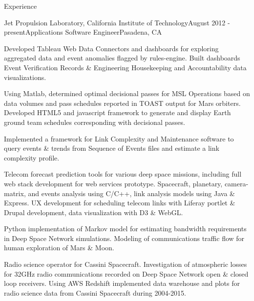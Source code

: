 \documentclass{resume} %
\begin{document}





\begin{rSection}{Experience}
\begin{rSubsection}{Jet Propulsion Laboratory, California Institute of Technology}{August 2012 - present}{Applications Software Engineer}{Pasadena, CA}
\item Developed Tableau Web Data Connectors and dashboards for exploring aggregated data and event anomalies flagged by rules-engine. Built dashboards Event Verification Records \& Engineering Housekeeping and Accountability data visualizations.
\item Using Matlab, determined optimal decisional passes for MSL Operations based on data volumes and pass schedules reported in TOAST output for Mars orbiters. Developed HTML5 and javascript framework to generate and display Earth ground team schedules corresponding with decisional passes.
\item Implemented a framework for Link Complexity and Maintenance software to query events \& trends from Sequence of Events files and estimate a link complexity profile.
\item Telecom forecast prediction tools for various deep space missions, including full web stack development for web services prototype. Spacecraft, planetary, camera-matrix, and events analysis using C/C++, link analysis models using Java \& Express. UX development for scheduling telecom links with Liferay portlet \& Drupal development, data visualization with D3 \& WebGL. 
\item Python implementation of Markov model for estimating bandwidth requirements in Deep Space Network simulations. Modeling of communications traffic flow for human exploration of Mars \& Moon. 
\item Radio science operator for Cassini Spacecraft. Investigation of atmospheric losses for 32GHz radio communications recorded on Deep Space Network open \& closed loop receivers. Using AWS Redshift implemented data warehouse and plots for radio science data from Cassini Spacecraft during 2004-2015. 
\end{rSubsection}


\end{rSection}
\end{document}
